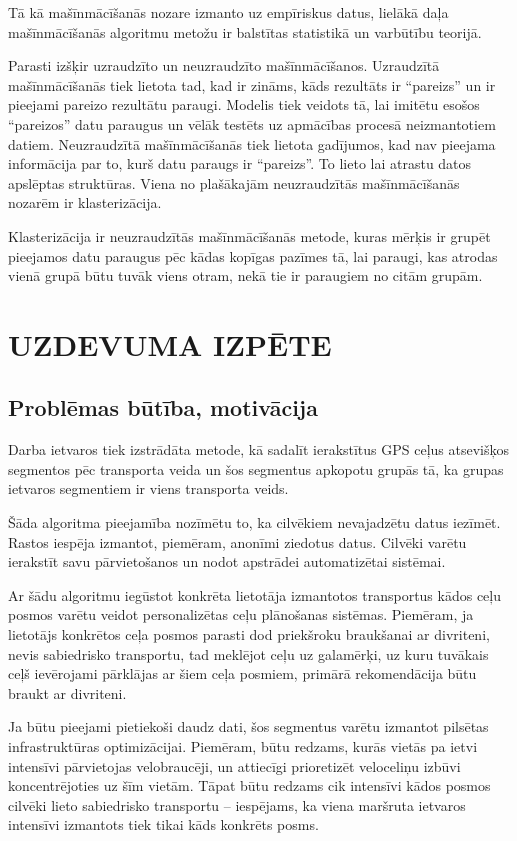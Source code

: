 \documentclass{ludis}
\begin{document}
Tā kā mašīnmācīšanās nozare izmanto uz empīriskus datus, lielākā daļa mašīnmācīšanās
algoritmu metožu ir balstītas statistikā un varbūtību teorijā. 

Parasti izšķir uzraudzīto un neuzraudzīto mašīnmācīšanos. Uzraudzītā mašīnmācīšanās tiek lietota
tad, kad ir zināms, kāds rezultāts ir ``pareizs'' un ir pieejami pareizo rezultātu paraugi.
Modelis tiek veidots tā, lai imitētu esošos ``pareizos'' datu paraugus un vēlāk testēts uz 
apmācības procesā neizmantotiem datiem. Neuzraudzītā mašīnmācīšanās tiek lietota gadī\-jumos, kad
nav pieejama informācija par to, kurš datu paraugs ir ``pareizs''. To lieto lai atrastu datos
apslēptas struktūras. Viena no plašākajām neuzraudzītās mašīnmācīšanās nozarēm 
ir \linebreak klasterizācija.

Klasterizācija ir neuzraudzītās mašīnmācīšanās metode, kuras mērķis ir grupēt pieejamos datu
paraugus pēc kādas kopīgas pazīmes tā, lai paraugi, kas atrodas vienā grupā būtu tuvāk viens otram,
nekā tie ir paraugiem no citām grupām. 

\chapter{UZDEVUMA IZPĒTE}
\section{Problēmas būtība, motivācija}
Darba ietvaros tiek izstrādāta metode, kā sadalīt ierakstītus GPS ceļus atsevišķos segmentos
pēc transporta veida un šos segmentus apkopotu grupās tā, ka grupas ietvaros segmentiem ir viens
transporta veids.

Šāda algoritma pieejamība nozīmētu to, ka cilvēkiem nevajadzētu datus iezīmēt. Rastos iespēja
izmantot, piemēram, anonīmi ziedotus datus. Cilvēki varētu ierakstīt savu pārvietošanos
un nodot apstrādei automatizētai sistēmai.

Ar šādu algoritmu iegūstot konkrēta lietotāja izmantotos transportus kādos ceļu posmos varētu veidot
personalizētas ceļu plānošanas sistēmas. Piemēram, ja lietotājs konkrētos ceļa posmos parasti
dod priekšroku braukšanai ar divriteni, nevis sabiedrisko transportu, tad \linebreak meklējot
 ceļu uz galamērķi,
uz kuru tuvākais ceļš ievērojami pārklājas ar šiem ceļa posmiem, primārā rekomendācija būtu
braukt ar divriteni.

Ja būtu pieejami pietiekoši daudz dati, šos segmentus varētu izmantot pilsētas infrastruk\-tūras
optimizācijai. Piemēram, būtu redzams, kurās vietās pa ietvi intensīvi pārvietojas velo\-braucēji,
un attiecīgi prioretizēt veloceliņu izbūvi koncentrējoties uz šīm vietām. Tāpat būtu redzams cik
intensīvi kādos posmos cilvēki lieto sabiedrisko transportu -- iespējams, ka viena maršruta ietvaros
intensīvi izmantots tiek tikai kāds konkrēts posms.
\end{document}
